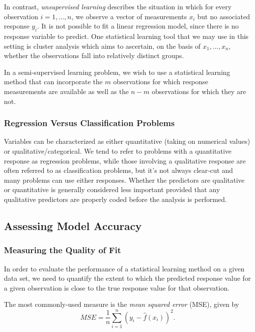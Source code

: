 \documentclass{article}
\numberwithin{equation}{section}
\begin{document}
In contrast, \textit{unsupervised learning} describes the situation in which for every observation $i = 1,...,n$, we observe a vector of measurements $x_i$ but no associated response $y_i$. It is not possible to fit a linear regression model, since there is no response variable to predict.  One statistical learning tool that we may use in this setting is cluster analysis which aims to ascertain, on the basis of $x_1,..., x_n$, whether the observations fall into relatively distinct groups.

In a semi-supervised learning problem, we wish to use a statistical learning method that can incorporate the $m$ observations for which response measurements are available as well as the $n - m$ observations for which they are not. 

\subsubsection{Regression Versus Classification Problems}
Variables can be characterized as either quantitative (taking on numerical values) or qualitative/categorical. We tend to refer to problems with a quantitative response as regression problems, while those involving a qualitative response are often referred to as classification problems, but it's not always clear-cut and many problems can use either responses. Whether the predictors are qualitative or quantitative is generally considered less important provided that any qualitative predictors are properly coded before the analysis is
performed.

\subsection{Assessing Model Accuracy}

\subsubsection{Measuring the Quality of Fit}
In order to evaluate the performance of a statistical learning method on a given data set, we need to quantify the extent to which the predicted response value for a given observation is close to the true response value for that observation.

The most commonly-used measure is the \textit{mean squared error} (MSE), given by
\begin{equation}
    MSE = \frac{1}{n} \sum_{i=1}^n (y_i - \hat f(x_i))^2.
\end{equation}
\end{document}
